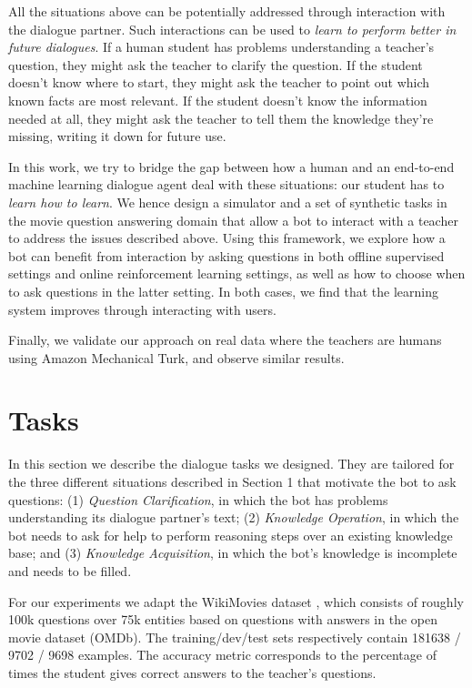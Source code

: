 All the situations above can be potentially addressed through interaction with
the dialogue partner. %
Such interactions can be used to {\em learn to perform better in future dialogues}.
If a human student has problems understanding a teacher's question, they
 might ask the teacher to clarify the question.
If the student doesn't know where to start, they might
 ask the teacher to point out which known facts are most relevant.
If the student doesn't know the information needed at all, they might
 ask the teacher to tell them the knowledge they're missing, writing it down
 for future use.

In this work, we try to bridge the gap between how a human and
an end-to-end machine learning dialogue agent deal with these situations:
our student has to {\em learn how to learn}.
We hence design a simulator and a set of synthetic tasks in the movie question answering domain
that allow a bot to interact with a teacher to address the issues described above.
Using this framework, we explore how a bot can benefit from interaction by asking questions
 in both offline supervised settings and online reinforcement learning settings,
 as well as how to choose when to ask questions in the latter setting.
In both cases, we find that the learning system improves through interacting with users.

Finally, we validate our approach on real data where the teachers are humans using Amazon Mechanical Turk,
and observe similar results.

\section{Tasks}
\label{sec:tasks}
In this section we describe the dialogue tasks we designed.
They are tailored for the three different situations described in Section 1
that motivate the bot to ask questions:
(1) {\it Question Clarification},
 in which the bot  has problems understanding its dialogue partner's text;
  (2) {\it Knowledge Operation},
in which the bot
 needs to ask for help to perform reasoning steps over an existing knowledge base;
  and (3) {\it Knowledge Acquisition},
  in which the bot's knowledge is incomplete and needs to be filled. %



For our experiments we adapt the WikiMovies dataset \citep{weston2015towards}, which consists
 of roughly 100k questions over 75k entities based on questions
with answers in the open movie dataset (OMDb).
 The training/dev/test sets respectively contain 181638 / 9702 / 9698 examples. The  accuracy metric corresponds to the percentage of times the student gives correct answers to the teacher's questions.

